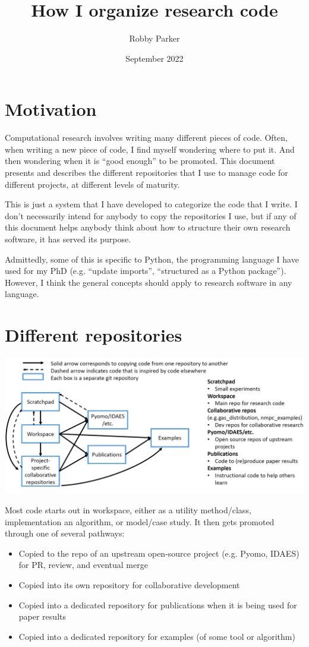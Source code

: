 \documentclass{article}
\title{How I organize research code}
\author{Robby Parker}
\date{September 2022}
\begin{document}
\maketitle

\section{Motivation}
Computational research involves writing many different pieces of code.
Often, when writing a new piece of code, I find myself wondering where
to put it. And then wondering when it is ``good enough'' to be promoted.
This document presents and describes the different repositories that I
use to manage code for different projects, at different levels of
maturity.

This is just a system that I have developed to categorize the code that
I write. I don't necessarily intend for anybody to copy the repositories
I use, but if any of this document helps anybody think about how to
structure their own research software, it has served its purpose.

Admittedly, some of this is specific to Python, the programming language
I have used for my PhD (e.g. ``update imports'', ``structured as a
Python package''). However, I think the general concepts should apply to
research software in any language.

\section{Different repositories}

\hspace{-1.5cm}\includegraphics[width=15cm]{repo_diagram}

Most code starts out in workspace, either as a utility method/class,
implementation an algorithm, or model/case study.
It then gets promoted through one of several pathways:
\begin{itemize}
  \item Copied to the repo of an upstream open-source project (e.g. Pyomo,
    IDAES) for PR, review, and eventual merge
  \item Copied into its own repository for collaborative development
  \item Copied into a dedicated repository for publications when it is
    being used for paper results
  \item Copied into a dedicated repository for examples (of some tool
    or algorithm)
\end{itemize}
\end{document}
